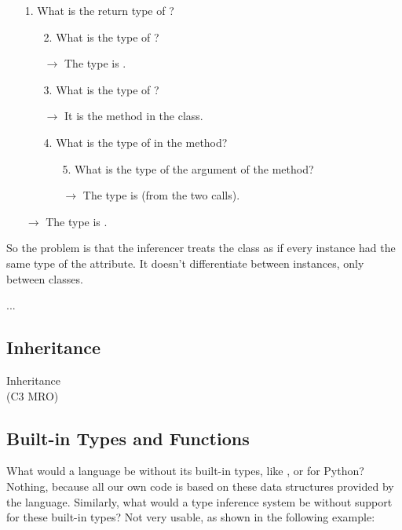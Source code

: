 \documentclass[12pt,halfparskip]{scrreprt}
\begin{document}
\begin{enumerate}
	\item[1.] What is the return type of ?
	\begin{enumerate}
		\item[2.] What is the type of ?
		\item[] $\rightarrow$ The type is .
		\item[3.] What is the type of ?
		\item[] $\rightarrow$ It is the  method in the  class.
		\item[4.] What is the type of  in the  method?
		\begin{enumerate}
			\item [5.] What is the type of the  argument of the  method?
			\item [] $\rightarrow$ The type is  (from the two  calls).
		\end{enumerate}
	\end{enumerate}
	\item [] $\rightarrow$ The type is .
\end{enumerate}

So the problem is that the inferencer treats the  class as if every instance had the same type of the  attribute. It doesn't differentiate between instances, only between classes.

... \cite{ddp}


\subsection{Inheritance}


Inheritance\\
 (C3 MRO)

\subsection{Built-in Types and Functions}

What would a language be without its built-in types, like ,  or  for Python? Nothing, because all our own code is based on these data structures provided by the language. Similarly, what would a type inference system be without support for these built-in types? Not very usable, as shown in the following example:
\end{document}
